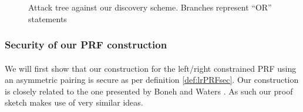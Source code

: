 	
		\begin{figure}[H]
			\begin{center}
				
				\caption{Attack tree against our discovery scheme. Branches represent ``OR'' statements}
				\label{fig:attacktree}
			\end{center}
		\end{figure}

	
	
		
		
		
		\subsubsection{Security of our PRF construction}
		
		\paragraph{} We will first show that our construction for the left/right constrained PRF using an asymmetric pairing is secure as per definition \autoref{def:lrPRFsec}. Our construction is closely related to the one presented by Boneh and Waters \cite{LRPRF}. As such our proof sketch makes use of very similar ideas.
		
